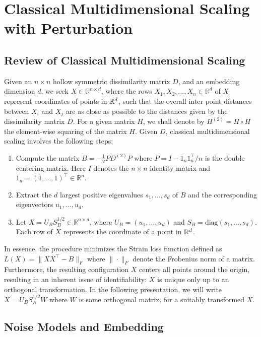 \chapter{Classical Multidimensional Scaling with Perturbation}
\label{sec:dmcs}

\section{Review of Classical Multidimensional Scaling}
\label{sec:cmds} 
Given an $n \times n$ hollow symmetric dissimilarity
matrix $D$, and an embedding dimension $d$, we seek $X \in
\mathbb{R}^{n \times d}$, where the rows $X_1, X_2, \dots, X_n \in
\mathbb{R}^d$ of $X$ represent coordinates of points in ${\mathbb R}^d$, such
that the overall inter-point distances between $X_i$ and $X_j$ are
as close as possible to the distances given by the dissimilarity
matrix $D$. For a given matrix $H$, we shall denote by $H^{(2)} = H
\circ H$ the element-wise squaring of the matrix $H$.
Given $D$, classical multidimensional scaling 
involves the following steps:
\begin{enumerate}
  \item Compute the matrix $B = -\frac{1}{2}P D^{(2)} P$ where $P = I - 1_n1_n^{\top}/n$ is the double centering matrix. Here $I$
denotes the $n \times n$ identity matrix and $1_n = (1, \dots,
1)^\top \in \mathbb{R}^n$.
  \item Extract the $d$ largest positive eigenvalues $s_1, \dots, s_d$
of $B$ and the corresponding eigenvectors ${u}_1, \dots, u_d$.
  \item Let $X = U_B S_B^{1/2} \in \mathbb{R}^{n \times d}$, where
$U_B = (u_1, \dots, u_d)$ and $S_B = \textrm{diag}(s_1, \dots,
s_{d})$. Each row of $X$ represents the coordinate of a point in
${\mathbb R}^d$.
\end{enumerate} 
In essence, the procedure minimizes the Strain loss
function defined as $L(X) = \| XX^{\top} - B \|_{F}$ where
$\|\cdot\|_{F}$ denote the Frobenius norm of a matrix. Furthermore,
the resulting configuration ${X}$ centers all points around the origin, resulting in an inherent issue of identifiability: $X$ is
unique only up to an orthogonal transformation. In the following
presentation, we will write $X = U_B S_B^{1/2} W$ where $W$ is some
orthogonal matrix, for a suitably transformed $X$.

\section{Noise Models and Embedding}
